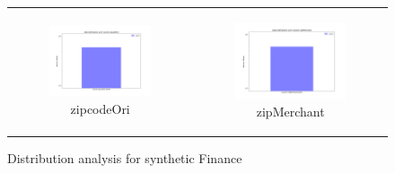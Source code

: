\begin{figure}
{\begin{tabular}[c]{cc}
     \begin{subfigure}[c]{0.45\textwidth}
         \centering
         \includegraphics[width=\textwidth]{assets/results/syntheticFincances/distribution/zipcodeOri.png}
         \caption{zipcodeOri}
         \label{}
     \end{subfigure} &
     
     \begin{subfigure}[c]{0.45\textwidth}
         \centering
         \includegraphics[width=\textwidth]{assets/results/syntheticFincances/distribution/zipMerchant.png}
         \caption{zipMerchant}
         \label{}
     \end{subfigure} 
     \end{tabular} 
     }
    \caption{Distribution analysis for synthetic Finance}
    \label{fig:synthetic_finance_distribution_analysis}
\end{figure}